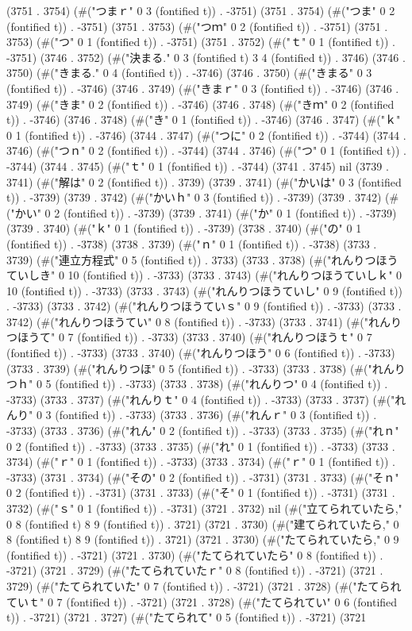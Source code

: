 (3751 . 3754) (#("つまｒ" 0 3 (fontified t)) . -3751) (3751 . 3754) (#("つま" 0 2 (fontified t)) . -3751) (3751 . 3753) (#("つｍ" 0 2 (fontified t)) . -3751) (3751 . 3753) (#("つ" 0 1 (fontified t)) . -3751) (3751 . 3752) (#("ｔ" 0 1 (fontified t)) . -3751) (3746 . 3752) (#("決まる." 0 3 (fontified t) 3 4 (fontified t)) . 3746) (3746 . 3750) (#("きまる." 0 4 (fontified t)) . -3746) (3746 . 3750) (#("きまる" 0 3 (fontified t)) . -3746) (3746 . 3749) (#("きまｒ" 0 3 (fontified t)) . -3746) (3746 . 3749) (#("きま" 0 2 (fontified t)) . -3746) (3746 . 3748) (#("きｍ" 0 2 (fontified t)) . -3746) (3746 . 3748) (#("き" 0 1 (fontified t)) . -3746) (3746 . 3747) (#("ｋ" 0 1 (fontified t)) . -3746) (3744 . 3747) (#("つに" 0 2 (fontified t)) . -3744) (3744 . 3746) (#("つｎ" 0 2 (fontified t)) . -3744) (3744 . 3746) (#("つ" 0 1 (fontified t)) . -3744) (3744 . 3745) (#("ｔ" 0 1 (fontified t)) . -3744) (3741 . 3745) nil (3739 . 3741) (#("解は" 0 2 (fontified t)) . 3739) (3739 . 3741) (#("かいは" 0 3 (fontified t)) . -3739) (3739 . 3742) (#("かいｈ" 0 3 (fontified t)) . -3739) (3739 . 3742) (#("かい" 0 2 (fontified t)) . -3739) (3739 . 3741) (#("か" 0 1 (fontified t)) . -3739) (3739 . 3740) (#("ｋ" 0 1 (fontified t)) . -3739) (3738 . 3740) (#("の" 0 1 (fontified t)) . -3738) (3738 . 3739) (#("ｎ" 0 1 (fontified t)) . -3738) (3733 . 3739) (#("連立方程式" 0 5 (fontified t)) . 3733) (3733 . 3738) (#("れんりつほうていしき" 0 10 (fontified t)) . -3733) (3733 . 3743) (#("れんりつほうていしｋ" 0 10 (fontified t)) . -3733) (3733 . 3743) (#("れんりつほうていし" 0 9 (fontified t)) . -3733) (3733 . 3742) (#("れんりつほうていｓ" 0 9 (fontified t)) . -3733) (3733 . 3742) (#("れんりつほうてい" 0 8 (fontified t)) . -3733) (3733 . 3741) (#("れんりつほうて" 0 7 (fontified t)) . -3733) (3733 . 3740) (#("れんりつほうｔ" 0 7 (fontified t)) . -3733) (3733 . 3740) (#("れんりつほう" 0 6 (fontified t)) . -3733) (3733 . 3739) (#("れんりつほ" 0 5 (fontified t)) . -3733) (3733 . 3738) (#("れんりつｈ" 0 5 (fontified t)) . -3733) (3733 . 3738) (#("れんりつ" 0 4 (fontified t)) . -3733) (3733 . 3737) (#("れんりｔ" 0 4 (fontified t)) . -3733) (3733 . 3737) (#("れんり" 0 3 (fontified t)) . -3733) (3733 . 3736) (#("れんｒ" 0 3 (fontified t)) . -3733) (3733 . 3736) (#("れん" 0 2 (fontified t)) . -3733) (3733 . 3735) (#("れｎ" 0 2 (fontified t)) . -3733) (3733 . 3735) (#("れ" 0 1 (fontified t)) . -3733) (3733 . 3734) (#("ｒ" 0 1 (fontified t)) . -3733) (3733 . 3734) (#("ｒ" 0 1 (fontified t)) . -3733) (3731 . 3734) (#("その" 0 2 (fontified t)) . -3731) (3731 . 3733) (#("そｎ" 0 2 (fontified t)) . -3731) (3731 . 3733) (#("そ" 0 1 (fontified t)) . -3731) (3731 . 3732) (#("ｓ" 0 1 (fontified t)) . -3731) (3721 . 3732) nil (#("立てられていたら," 0 8 (fontified t) 8 9 (fontified t)) . 3721) (3721 . 3730) (#("建てられていたら," 0 8 (fontified t) 8 9 (fontified t)) . 3721) (3721 . 3730) (#("たてられていたら," 0 9 (fontified t)) . -3721) (3721 . 3730) (#("たてられていたら" 0 8 (fontified t)) . -3721) (3721 . 3729) (#("たてられていたｒ" 0 8 (fontified t)) . -3721) (3721 . 3729) (#("たてられていた" 0 7 (fontified t)) . -3721) (3721 . 3728) (#("たてられていｔ" 0 7 (fontified t)) . -3721) (3721 . 3728) (#("たてられてい" 0 6 (fontified t)) . -3721) (3721 . 3727) (#("たてられて" 0 5 (fontified t)) . -3721) (3721 